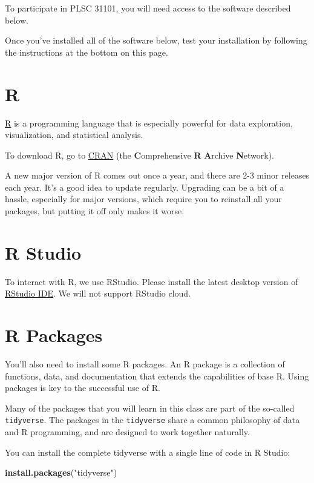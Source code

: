 \documentclass[]{book}
\newenvironment{Shaded}{\begin{snugshade}}{\end{snugshade}}
\newcommand{\KeywordTok}[1]{\textcolor[rgb]{0.13,0.29,0.53}{\textbf{#1}}}
\newcommand{\StringTok}[1]{\textcolor[rgb]{0.31,0.60,0.02}{#1}}
\newcommand{\NormalTok}[1]{#1}
\begin{document}
To participate in PLSC 31101, you will need access to the software
described below.

Once you've installed all of the software below, test your installation
by following the instructions at the bottom on this page.

\section{R}\label{r}

\href{http://www.r-project.org/}{R} is a programming language that is
especially powerful for data exploration, visualization, and statistical
analysis.

To download R, go to \href{https://cran.r-project.org/}{CRAN} (the
\textbf{C}omprehensive \textbf{R} \textbf{A}rchive \textbf{N}etwork).

A new major version of R comes out once a year, and there are 2-3 minor
releases each year. It's a good idea to update regularly. Upgrading can
be a bit of a hassle, especially for major versions, which require you
to reinstall all your packages, but putting it off only makes it worse.

\section{R Studio}\label{r-studio}

To interact with R, we use RStudio. Please install the latest desktop
version of \href{http://www.rstudio.com/ide/download/desktop}{RStudio
IDE}. We will not support RStudio cloud.

\section{R Packages}\label{r-packages}

You'll also need to install some R packages. An R package is a
collection of functions, data, and documentation that extends the
capabilities of base R. Using packages is key to the successful use of
R.

Many of the packages that you will learn in this class are part of the
so-called \texttt{tidyverse}. The packages in the \texttt{tidyverse}
share a common philosophy of data and R programming, and are designed to
work together naturally.

You can install the complete tidyverse with a single line of code in R
Studio:

\begin{Shaded}
\begin{Highlighting}[]
\KeywordTok{install.packages}\NormalTok{(}\StringTok{"tidyverse"}\NormalTok{)}
\end{Highlighting}
\end{Shaded}
\end{document}
